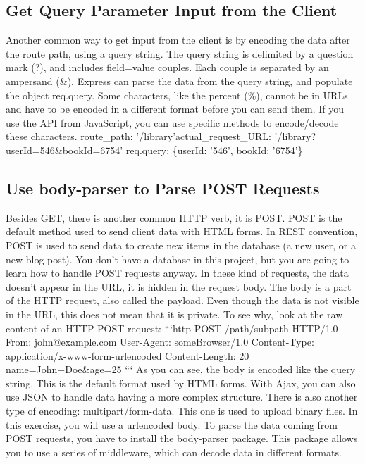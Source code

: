 \documentclass{article}%
\begin{document}
%
\subsection{Get Query Parameter Input from the Client}%
\label{subsec:GetQueryParameterInputfromtheClient}%
Another common way to get input from the client is by encoding the data after the route path, using a query string. The query string is delimited by a question mark (?), and includes field=value couples. Each couple is separated by an ampersand (\&). Express can parse the data from the query string, and populate the object req.query. Some characters, like the percent (\%), cannot be in URLs and have to be encoded in a different format before you can send them. If you use the API from JavaScript, you can use specific methods to encode/decode these characters.\newline%
route\_path: '/library'actual\_request\_URL: '/library?userId=546\&bookId=6754' req.query: \{userId: '546', bookId: '6754'\}\newline%

%
\subsection{Use body{-}parser to Parse POST Requests}%
\label{subsec:Usebody{-}parsertoParsePOSTRequests}%
Besides GET, there is another common HTTP verb, it is POST. POST is the default method used to send client data with HTML forms. In REST convention, POST is used to send data to create new items in the database (a new user, or a new blog post). You don’t have a database in this project, but you are going to learn how to handle POST requests anyway.\newline%
In these kind of requests, the data doesn’t appear in the URL, it is hidden in the request body. The body is a part of the HTTP request, also called the payload. Even though the data is not visible in the URL, this does not mean that it is private. To see why, look at the raw content of an HTTP POST request:\newline%
```http\newline%
POST /path/subpath HTTP/1.0\newline%
From: john@example.com\newline%
User{-}Agent: someBrowser/1.0\newline%
Content{-}Type: application/x{-}www{-}form{-}urlencoded\newline%
Content{-}Length: 20\newline%
name=John+Doe\&age=25\newline%
```\newline%
As you can see, the body is encoded like the query string. This is the default format used by HTML forms. With Ajax, you can also use JSON to handle data having a more complex structure. There is also another type of encoding: multipart/form{-}data. This one is used to upload binary files.\newline%
In this exercise, you will use a urlencoded body. To parse the data coming from POST requests, you have to install the body{-}parser package. This package allows you to use a series of middleware, which can decode data in different formats.\newline%
\end{document}
